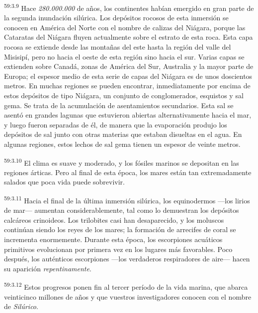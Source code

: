 \par
\textsuperscript{59:3.9} Hace \textit{280.000.000} de años, los continentes habían emergido en gran parte de la segunda inundación silúrica. Los depósitos rocosos de esta inmersión se conocen en América del Norte con el nombre de calizas del Niágara, porque las Cataratas del Niágara fluyen actualmente sobre el estrato de esta roca. Esta capa rocosa se extiende desde las montañas del este hasta la región del valle del Misisipí, pero no hacia el oeste de esta región sino hacia el sur. Varias capas se extienden sobre Canadá, zonas de América del Sur, Australia y la mayor parte de Europa; el espesor medio de esta serie de capas del Niágara es de unos doscientos metros. En muchas regiones se pueden encontrar, inmediatamente por encima de estos depósitos de tipo Niágara, un conjunto de conglomerados, esquistos y sal gema. Se trata de la acumulación de asentamientos secundarios. Esta sal se asentó en grandes lagunas que estuvieron abiertas alternativamente hacia el mar, y luego fueron separadas de él, de manera que la evaporación produjo los depósitos de sal junto con otras materias que estaban disueltas en el agua. En algunas regiones, estos lechos de sal gema tienen un espesor de veinte metros.

\par
\textsuperscript{59:3.10} El clima es suave y moderado, y los fósiles marinos se depositan en las regiones árticas. Pero al final de esta época, los mares están tan extremadamente salados que poca vida puede sobrevivir.

\par
\textsuperscript{59:3.11} Hacia el final de la última inmersión silúrica, los equinodermos ---los lirios de mar--- aumentan considerablemente, tal como lo demuestran los depósitos calcáreos crinoideos. Los trilobites casi han desaparecido, y los moluscos continúan siendo los reyes de los mares; la formación de arrecifes de coral se incrementa enormemente. Durante esta época, los escorpiones acuáticos primitivos evolucionan por primera vez en los lugares más favorables. Poco después, los auténticos escorpiones ---los verdaderos respiradores de aire--- hacen su aparición \textit{repentinamente}.

\par
\textsuperscript{59:3.12} Estos progresos ponen fin al tercer período de la vida marina, que abarca veinticinco millones de años y que vuestros investigadores conocen con el nombre de \textit{Silúrico}.

